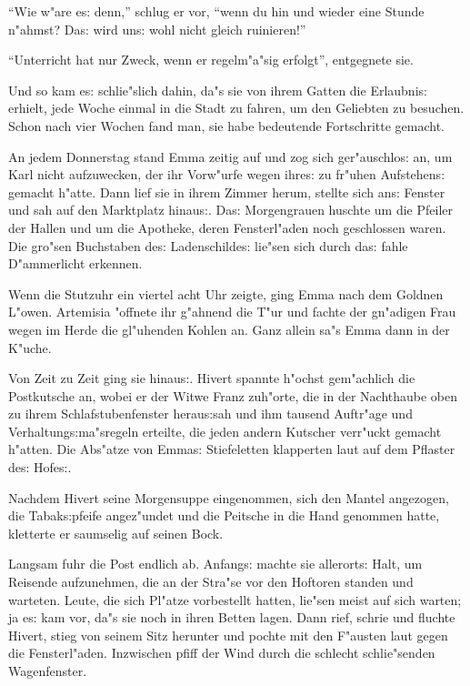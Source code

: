 \documentclass[oneside,12pt]{book}
\newcommand{\s}{s:}%
\begin{document}
"`Wie w"are e{\s} denn,"' schlug er vor, "`wenn du hin und wieder
eine Stunde n"ahmst? Da{\s} wird un{\s} wohl nicht gleich
ruinieren!"'

"`Unterricht hat nur Zweck, wenn er regelm"a"sig erfolgt"',
entgegnete sie.

Und so kam e{\s} schlie"slich dahin, da"s sie von ihrem Gatten die
Erlaubni{\s} erhielt, jede Woche einmal in die Stadt zu fahren, um
den Geliebten zu besuchen. Schon nach vier Wochen fand man, sie
habe bedeutende Fortschritte gemacht.


\newpage\begin{center}
{\large \so{F"unfte{\s} Kapitel}}\bigskip\bigskip
\end{center}

An jedem Donnerstag stand Emma zeitig auf und zog sich
ger"auschlo{\s} an, um Karl nicht aufzuwecken, der ihr Vorw"urfe
wegen ihre{\s} zu fr"uhen Aufstehen{\s} gemacht h"atte. Dann lief
sie in ihrem Zimmer herum, stellte sich an{\s} Fenster und sah auf
den Marktplatz hinau{\s}. Da{\s} Morgengrauen huschte um die
Pfeiler der Hallen und um die Apotheke, deren Fensterl"aden noch
geschlossen waren. Die gro"sen Buchstaben de{\s} Ladenschilde{\s}
lie"sen sich durch da{\s} fahle D"ammerlicht erkennen.

Wenn die Stutzuhr ein viertel acht Uhr zeigte, ging Emma nach dem
Goldnen L"owen. Artemisia "offnete ihr g"ahnend die T"ur und
fachte der gn"adigen Frau wegen im Herde die gl"uhenden Kohlen an.
Ganz allein sa"s Emma dann in der K"uche.

Von Zeit zu Zeit ging sie hinau{\s}. Hivert spannte h"ochst
gem"achlich die Postkutsche an, wobei er der Witwe Franz zuh"orte,
die in der Nachthaube oben zu ihrem Schlafstubenfenster
herau{\s}sah und ihm tausend Auftr"age und Verhaltung{\s}ma"sregeln
erteilte, die jeden andern Kutscher verr"uckt gemacht h"atten. Die
Abs"atze von Emma{\s} Stiefeletten klapperten laut auf dem
Pflaster de{\s} Hofe{\s}.

Nachdem Hivert seine Morgensuppe eingenommen, sich den Mantel
angezogen, die Tabak{\s}pfeife angez"undet und die Peitsche in die
Hand genommen hatte, kletterte er saumselig auf seinen Bock.

Langsam fuhr die Post endlich ab. Anfang{\s} machte sie
allerort{\s} Halt, um Reisende aufzunehmen, die an der Stra"se vor
den Hoftoren standen und warteten. Leute, die sich Pl"atze
vorbestellt hatten, lie"sen meist auf sich warten; ja e{\s} kam
vor, da"s sie noch in ihren Betten lagen. Dann rief, schrie und
fluchte Hivert, stieg von seinem Sitz herunter und pochte mit den
F"austen laut gegen die Fensterl"aden. Inzwischen pfiff der Wind
durch die schlecht schlie"senden Wagenfenster.
\end{document}
